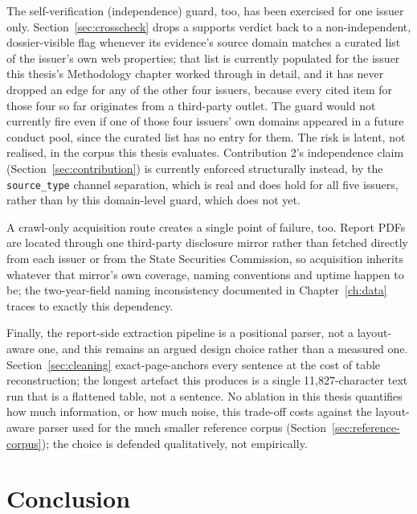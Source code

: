 \documentclass[fontsize=12pt,oneside,headings=small]{scrreprt}
\begin{document}
The self-verification (independence) guard, too, has been exercised for one issuer only. Section~\ref{sec:crosscheck} drops a \textsf{supports} verdict back to a non-independent, dossier-visible flag whenever its evidence's source domain matches a curated list of the issuer's own web properties; that list is currently populated for the issuer this thesis's Methodology chapter worked through in detail, and it has never dropped an edge for any of the other four issuers, because every cited item for those four so far originates from a third-party outlet. The guard would not currently fire even if one of those four issuers' own domains appeared in a future conduct pool, since the curated list has no entry for them. The risk is latent, not realised, in the corpus this thesis evaluates. Contribution 2's independence claim (Section~\ref{sec:contribution}) is currently enforced structurally instead, by the \texttt{source\_type} channel separation, which is real and does hold for all five issuers, rather than by this domain-level guard, which does not yet.

A crawl-only acquisition route creates a single point of failure, too. Report PDFs are located through one third-party disclosure mirror rather than fetched directly from each issuer or from the State Securities Commission, so acquisition inherits whatever that mirror's own coverage, naming conventions and uptime happen to be; the two-year-field naming inconsistency documented in Chapter~\ref{ch:data} traces to exactly this dependency.

Finally, the report-side extraction pipeline is a positional parser, not a layout-aware one, and this remains an argued design choice rather than a measured one. Section~\ref{sec:cleaning} exact-page-anchors every sentence at the cost of table reconstruction; the longest artefact this produces is a single 11,827-character text run that is a flattened table, not a sentence. No ablation in this thesis quantifies how much information, or how much noise, this trade-off costs against the layout-aware parser used for the much smaller reference corpus (Section~\ref{sec:reference-corpus}); the choice is defended qualitatively, not empirically.

\chapter{Conclusion}
\label{ch:conclusion}
\enlargethispage{2\baselineskip}
\end{document}
